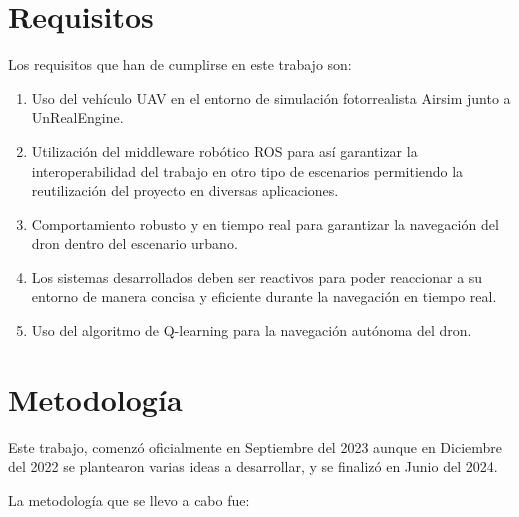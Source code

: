 \section{Requisitos}
\label{sec:requisitos}

Los requisitos que han de cumplirse en este trabajo son: 
\begin{enumerate}
    \item Uso del vehículo UAV en el entorno de simulación fotorrealista Airsim junto a UnRealEngine.
    \item Utilización del middleware robótico ROS para así garantizar la interoperabilidad del trabajo en otro tipo de escenarios permitiendo
    la reutilización del proyecto en diversas aplicaciones. 
    \item Comportamiento robusto y en tiempo real para garantizar la navegación del dron dentro del escenario urbano.
    \item Los sistemas desarrollados deben ser reactivos para poder reaccionar a su entorno de manera concisa y eficiente durante
    la navegación en tiempo real.
    \item Uso del algoritmo de Q-learning para la navegación autónoma del dron. 
\end{enumerate}


\section{Metodología}
\label{sec:metodologia}

Este trabajo, comenzó oficialmente en Septiembre del 2023 aunque en Diciembre del 2022 se plantearon varias ideas a desarrollar, y se finalizó en Junio del 2024.

La metodología que se llevo a cabo fue:


